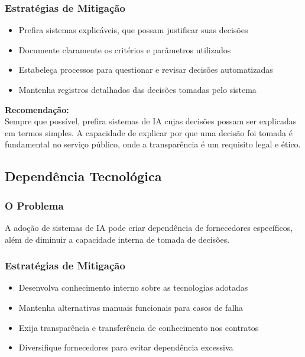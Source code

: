 \documentclass[12pt,a4paper]{article}
\begin{document}
\subsubsection{Estratégias de Mitigação}
\begin{itemize}
    \item Prefira sistemas explicáveis, que possam justificar suas decisões
    \item Documente claramente os critérios e parâmetros utilizados
    \item Estabeleça processos para questionar e revisar decisões automatizadas
    \item Mantenha registros detalhados das decisões tomadas pelo sistema
\end{itemize}

\begin{tcolorbox}[highlight]
\textbf{Recomendação:} \\
Sempre que possível, prefira sistemas de IA cujas decisões possam ser explicadas em termos simples. A capacidade de explicar por que uma decisão foi tomada é fundamental no serviço público, onde a transparência é um requisito legal e ético.
\end{tcolorbox}

\subsection{Dependência Tecnológica}

\subsubsection{O Problema}
A adoção de sistemas de IA pode criar dependência de fornecedores específicos, além de diminuir a capacidade interna de tomada de decisões.

\subsubsection{Estratégias de Mitigação}
\begin{itemize}
    \item Desenvolva conhecimento interno sobre as tecnologias adotadas
    \item Mantenha alternativas manuais funcionais para casos de falha
    \item Exija transparência e transferência de conhecimento nos contratos
    \item Diversifique fornecedores para evitar dependência excessiva
\end{itemize}
\end{document}
